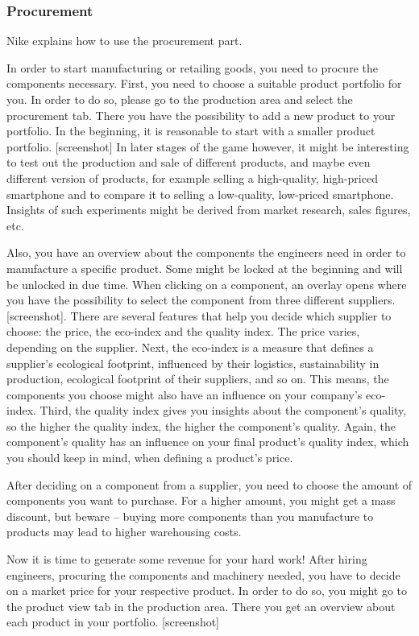 \documentclass[11pt,titlepage,oneside,openany]{book}
\begin{document}
\subsubsection{Procurement}
Nike explains how to use the procurement part.

In order to start manufacturing or retailing goods, you need to procure the components necessary. First, you need to choose a suitable product portfolio for you. In order to do so, please go to the production area and select the procurement tab. There you have the possibility to add a new product to your portfolio. In the beginning, it is reasonable to start with a smaller product portfolio. [screenshot] In later stages of the game however, it might be interesting to test out the production and sale of different products, and maybe even different version of products, for example selling a high-quality, high-priced smartphone and to compare it to selling a low-quality, low-priced smartphone. Insights of such experiments might be derived from market research, sales figures, etc.

Also, you have an overview about the components the engineers need in order to manufacture a specific product. Some might be locked at the beginning and will be unlocked in due time. When clicking on a component, an overlay opens where you have the possibility to select the component from three different suppliers. [screenshot]. There are several features that help you decide which supplier to choose: the price, the eco-index and the quality index. The price varies, depending on the supplier. Next, the eco-index is a measure that defines a supplier’s ecological footprint, influenced by their logistics, sustainability in production, ecological footprint of their suppliers, and so on. This means, the components you choose might also have an influence on your company’s eco-index. Third, the quality index gives you insights about the component’s quality, so the higher the quality index, the higher the component’s quality. Again, the component’s quality has an influence on your final product’s quality index, which you should keep in mind, when defining a product’s price.

After deciding on a component from a supplier, you need to choose the amount of components you want to purchase. For a higher amount, you might get a mass discount, but beware --  buying more components than you manufacture to products may lead to higher warehousing costs. 

Now it is time to generate some revenue for your hard work! After hiring engineers, procuring the components and machinery needed, you have to decide on a market price for your respective product. In order to do so, you might go to the product view tab in the production area. There you get an overview about each product in your portfolio. [screenshot]
\end{document}
